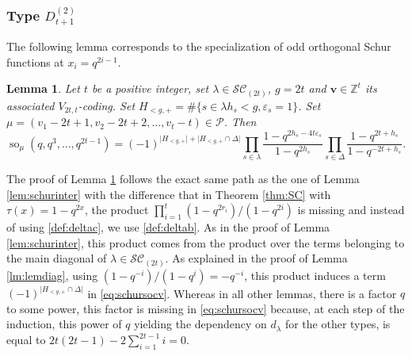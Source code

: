 \documentclass[11pt,letterpaper]{amsart}
\def\bbbz{\mathbb Z}
\def\ccsc{\mathcal {SC}}
\def\ccp{\mathcal P}
\newtheorem{lm}[df]{Lemma}
\DeclareMathOperator{\oo}{so}
\numberwithin{equation}{section}
\numberwithin{df}{section}
\begin{document}
\subsubsection{Type $D^{(2)}_{t+1}$}

The following lemma corresponds to the specialization of odd orthogonal Schur functions at $x_i=q^{2i-1}$.

\begin{lm}\label{lem:schurocv}
Let $t$ be a positive integer, set $\lambda\in\ccsc_{(2t)}$, $g=2t$ and $\mathbf{v}\in\bbbz^t$ its associated $V_{2t,t}$-coding. Set $H_{<g,+}=\#\lbrace s\in\lambda h_s<g, \varepsilon_s=1\rbrace$. Set $\mu=(v_1-2t+1,v_2-2t+2,\dots,v_t-t)\in\ccp$. Then
 \begin{equation}\label{eq:schursocv}
\oo_{\mu}(q,q^3,\dots,q^{2t-1})=(-1)^{\lvert H_{<g,+}\rvert+\lvert H_{<g,+}\cap \Delta\rvert} \prod_{s\in\lambda}\frac{1-q^{2h_s-4t\varepsilon_s}}{1-q^{2h_s}}\prod_{s\in\Delta}\frac{1-q^{2t+h_s}}{1-q^{-2t+h_s}}.
 \end{equation}
 \end{lm}


The proof of Lemma \ref{lem:schurocv} follows the exact same path as the one of Lemma \ref{lem:schurinter} with the difference that in Theorem \ref{thm:SC} with $\tau(x)=1-q^{2x}$, the product $\prod_{i=1}^t (1-q^{2r_i})/(1-q^{2i})$ is missing and instead of using \eqref{def:deltac}, we use \eqref{def:deltab}. As in the proof of Lemma \ref{lem:schurinter}, this product comes from the product over the terms belonging to the main diagonal of $\lambda\in\ccsc_{(2t)}$. As explained in the proof of Lemma \ref{lm:lemdiag}, using $(1-q^{-i})/(1-q^i)=-q^{-i}$, this product induces a term $(-1)^{\lvert H_{<g,+}\cap\Delta\rvert}$ in \eqref{eq:schursocv}. Whereas in all other lemmas, there is a factor $q$ to some power, this factor is missing in \eqref{eq:schursocv} because, at each step of the induction, this power of $q$ yielding the dependency on $d_\lambda$ for the other types, is equal to $2t(2t-1)-2\sum_{i=1}^{2t-1}i=0$.
\end{document}
